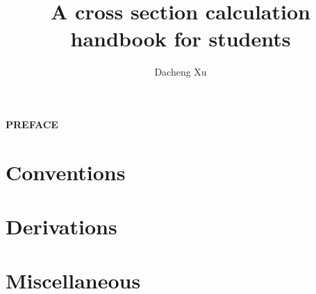 \documentclass[titlepage]{book}
\title{\textbf{\huge{A cross section calculation handbook for students}}}
\author{
    Dacheng Xu
}
\date{}
\begin{document}

\maketitle


\begin{center}
    \textbf{\Large{PREFACE}}
\end{center}




\pagestyle{empty}
\renewcommand{\baselinestretch}{0.94}\normalsize
\tableofcontents
\listoftodos
\renewcommand{\baselinestretch}{1.0}\normalsize
\restoregeometry
\pagestyle{fancy}

\clearpage



\section{Conventions}


\section{Derivations}





\section{Miscellaneous}


% 



\end{document}
